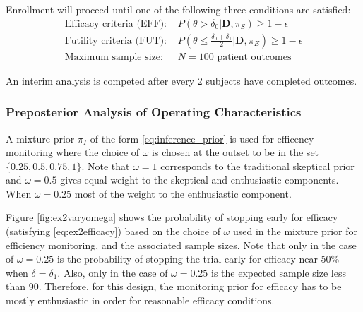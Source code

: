 \documentclass[12pt]{article}
\begin{document}


%				

Enrollment will proceed until one of the following three conditions are satisfied:
\begin{align*}
\text{Efficacy criteria (EFF): }&P(\theta>\delta_0|\mathbf{D},\pi_S)\geq 1-\epsilon %
\\
\text{Futility criteria (FUT): }&P\left(\theta \leq \frac{\delta_0+\delta_1}{2}\Big|\mathbf{D},\pi_E\right)\geq 1-\epsilon
\\
\text{Maximum sample size: }&N=100 \text{ patient outcomes}%
\end{align*}

An interim analysis is competed after every 2 subjects have completed outcomes.

\subsubsection{Preposterior Analysis of Operating Characteristics}\label{sec:ex2operatingcharacteristics}
A mixture prior $\pi_I$ of the form \eqref{eq:inference_prior} is used for efficency monitoring where the choice of $\omega$ is chosen at the outset to be in the set $\{0.25,0.5,0.75,1\}$. Note that $\omega=1$ corresponds to the traditional skeptical prior and $\omega=0.5$ gives equal weight to the skeptical and enthusiastic components. When $\omega=0.25$ most of the weight to the enthusiastic component.

Figure \ref{fig:ex2varyomega} shows the probability of stopping early for efficacy (satisfying \eqref{eq:ex2efficacy}) based on the choice of $\omega$ used in the mixture prior for efficiency monitoring, and the associated sample sizes. Note that only in the case of $\omega=0.25$ is the probability of stopping the trial early for efficacy near 50\% when $\delta=\delta_1$. Also, only in the case of $\omega=0.25$ is the expected sample size less than 90. Therefore, for this design, the monitoring prior for efficacy has to be mostly enthusiastic in order for reasonable efficacy conditions.
\end{document}
